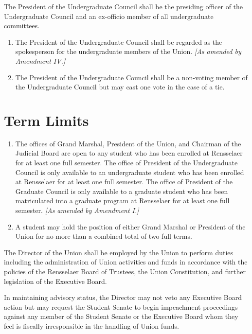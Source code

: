 \documentclass{uniondoc}
\begin{document}
The President of the Undergraduate Council shall be the presiding officer of the Undergraduate Council and an ex-officio member of all undergraduate committees.

\begin{enumerate}
	\item The President of the Undergraduate Council shall be regarded as the spokesperson for the undergraduate members of the Union. \textit{[As amended by Amendment IV.]}
	\item The President of the Undergraduate Council shall be a non-voting member of the Undergraduate Council but may cast one vote in the case of a tie.
\end{enumerate}

\section{Term Limits}

\begin{enumerate}
	\item The offices of Grand Marshal, President of the Union, and Chairman of the Judicial Board are open to any student who has been enrolled at Rensselaer for at least one full semester. The office of President of the Undergraduate Council is only available to an undergraduate student who has been enrolled at Rensselaer for at least one full semester. The office of President of the Graduate Council is only available to a graduate student who has been matriculated into a graduate program at Rensselaer for at least one full semester. \textit{[As amended by Amendment I.]}
	\item A student may hold the position of either Grand Marshal or President of the Union for no more than a combined total of two full terms.
\end{enumerate}


The Director of the Union shall be employed by the Union to perform duties including the administration of Union activities and funds in accordance with the policies of the Rensselaer Board of Trustees, the Union Constitution, and further legislation of the Executive Board.

In maintaining advisory status, the Director may not veto any Executive Board action but may request the Student Senate to begin impeachment proceedings against any member of the Student Senate or the Executive Board whom they feel is fiscally irresponsible in the handling of Union funds.
\end{document}
